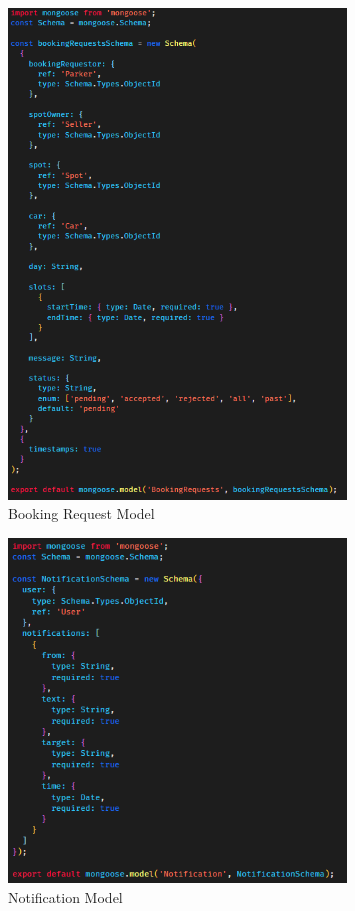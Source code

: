         \begin{figure}[h]
            \centering
            \includegraphics[width=0.8\textwidth]{images/bookingModel.png}
            \caption{Booking Request Model}
            \label{fig:bookingModel}
        \end{figure}


        \begin{figure}[h]
            \centering
            \includegraphics[width=0.8\textwidth]{images/notificationModel.png}
            \caption{Notification Model}
            \label{fig:notificationModel}
        \end{figure}


